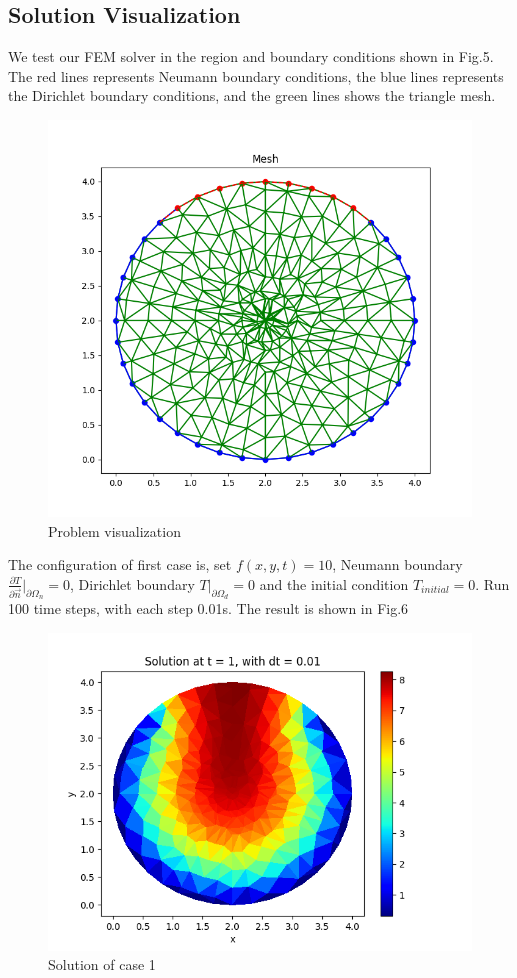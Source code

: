 \documentclass[conference]{IEEEtran}
\begin{document}
    \subsection{Solution Visualization}
    We test our FEM solver in the region and boundary conditions shown in Fig.5. The red lines represents 
    Neumann boundary conditions, the blue lines represents the Dirichlet boundary conditions, and the green lines
    shows the triangle mesh.
    \begin{figure}[H]
        \centering
        \includegraphics[scale=0.35]{../fig/mesh.png}
        \caption{Problem visualization}
    \end{figure}
    The configuration of first case is, set $f(x, y, t) = 10$, Neumann boundary $\frac{\partial{T}}{\partial{\vec{n}}}\big |_{\partial{\Omega_n}} = 0$, 
    Dirichlet boundary $T\big| _{\partial{\Omega_d}} = 0$ and the initial condition $T_{initial} = 0$. Run 100 time steps, 
    with each step 0.01s. The result is shown in Fig.6
    \begin{figure}[H]
        \centering
        \includegraphics[scale=0.4]{../fig/ext_heat10_zero_others.png}
        \caption{Solution of case 1}
    \end{figure}
\end{document}
